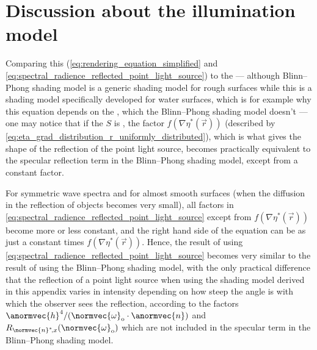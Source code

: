 \section{Discussion about the illumination model}

Comparing this  ( \ref{eq:rendering_equation_simplified} and \ref{eq:spectral_radience_reflected_point_light_source}) to the  --- although Blinn--Phong shading model is a generic shading model for rough surfaces while this is a shading model specifically developed for water surfaces, which is for example why this equation depends on the , which the Blinn--Phong shading model doesn't --- one may notice that if the  $S$ is , the factor $f(\nabla\eta^*(\vec{r}))$ (described by \eqref{eq:eta_grad_distribution_r_uniformly_distributed}), which is what gives the shape of the reflection of the point light source, becomes practically equivalent to the specular reflection term in the Blinn--Phong shading model, except from a constant factor.

For symmetric wave spectra and for almost smooth surfaces (when the diffusion in the reflection of objects becomes very small), all factors in \eqref{eq:spectral_radience_reflected_point_light_source} except from $f(\nabla\eta^*(\vec{r}))$ become more or less constant, and the right hand side of the equation can be \approximated as just a constant times $f(\nabla\eta^*(\vec{r}))$. Hence, the result of using \eqref{eq:spectral_radience_reflected_point_light_source} becomes very similar to the result of using the Blinn--Phong shading model, with the only practical difference that the reflection of a point light source when using the shading model derived in this appendix varies in intensity depending on how steep the angle is with which the observer sees the reflection, according to the factors $\anormvec{h}^4/(\normvec{\omega}_{\text{o}}\cdot\anormvec{n})$ and $R_{\normvec{n}^*\!,x}(\normvec{\omega}_{\text{o}})$ which are not included in the specular term in the Blinn--Phong shading model.

